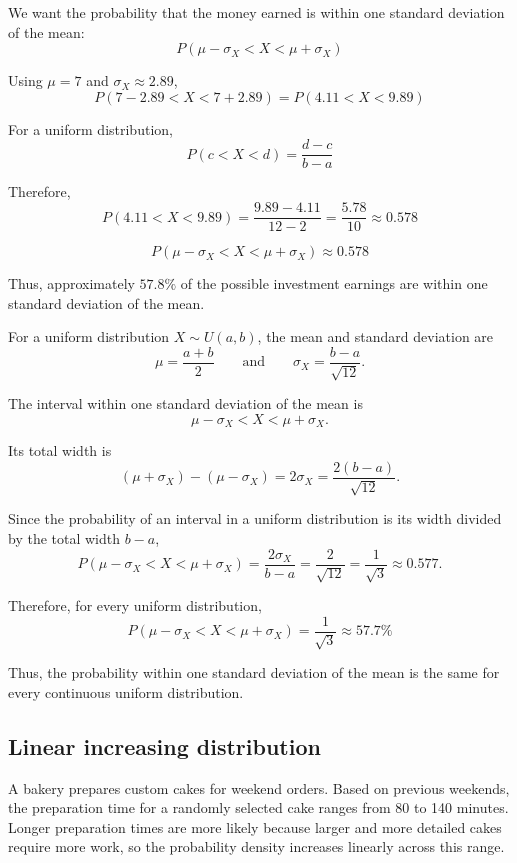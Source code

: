 We want the probability that the money earned is within one standard
deviation of the mean:
\[
P(\mu-\sigma_X<X<\mu+\sigma_X)
\]

Using $\mu=7$ and $\sigma_X\approx2.89$,
\[
P(7-2.89<X<7+2.89)
=
P(4.11<X<9.89)
\]

For a uniform distribution,
\[
P(c<X<d)=\frac{d-c}{b-a}
\]

Therefore,
\[
P(4.11<X<9.89)
=
\frac{9.89-4.11}{12-2}
=
\frac{5.78}{10}
\approx0.578
\]

\[
\boxed{P(\mu-\sigma_X<X<\mu+\sigma_X)\approx0.578}
\]

Thus, approximately $57.8\%$ of the possible investment earnings
are within one standard deviation of the mean.


For a uniform distribution $X\sim U(a,b)$, the mean and standard
deviation are
\[
\mu=\frac{a+b}{2}
\qquad\text{and}\qquad
\sigma_X=\frac{b-a}{\sqrt{12}}.
\]

The interval within one standard deviation of the mean is
\[
\mu-\sigma_X<X<\mu+\sigma_X.
\]

Its total width is
\[
(\mu+\sigma_X)-(\mu-\sigma_X)
=2\sigma_X
=\frac{2(b-a)}{\sqrt{12}}.
\]

Since the probability of an interval in a uniform distribution is its
width divided by the total width $b-a$,
\[
P(\mu-\sigma_X<X<\mu+\sigma_X)
=
\frac{2\sigma_X}{b-a}
=
\frac{2}{\sqrt{12}}
=
\frac{1}{\sqrt{3}}
\approx0.577.
\]

Therefore, for every uniform distribution,
\[
\boxed{
	P(\mu-\sigma_X<X<\mu+\sigma_X)
	=\frac{1}{\sqrt{3}}
	\approx57.7\%
}
\]

Thus, the probability within one standard deviation of the mean is
the same for every continuous uniform distribution.

\subsection{Linear increasing distribution}\label{sec:c4-problem-linear-increasing}


A bakery prepares custom cakes for weekend orders. Based on previous
weekends, the preparation time for a randomly selected cake ranges from
80 to 140 minutes. Longer preparation times are more likely because
larger and more detailed cakes require more work, so the probability
density increases linearly across this range.

